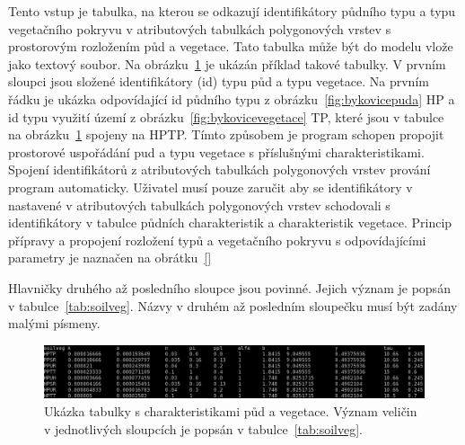 Tento vstup je tabulka, na kterou se odkazují identifikátory půdního typu a typu vegetačního pokryvu v atributových tabulkách polygonových vrstev s prostorovým rozložením půd a vegetace. Tato tabulka může být do modelu vlože jako textový soubor. Na obrázku~\ref{fig:tabsoilveg} je ukázán příklad takové tabulky. V prvním sloupci jsou složené identifikátory (id) typu půd a typu vegetace. Na prvním řádku je ukázka odpovídající id půdního typu z obrázku~\ref{fig:bykovicepuda} HP a id typu využití území z obrázku~\ref{fig:bykovicevegetace} TP, které jsou v tabulce na obrázku~\ref{fig:tabsoilveg} spojeny na HPTP. Tímto způsobem je program schopen propojit prostorové uspořádání pud a typu vegetace s příslušnými charakteristikami. Spojení identifikátorů z atributových tabulkách polygonových vrstev prování program automaticky. Uživatel musí pouze zaručit aby se identifikátory v nastavené v atributových tabulkách polygonových vrstev schodovali s identifikátory v tabulce půdních charakteristik a charakteristik vegetace. Princip přípravy a propojení rozložení typů a vegetačního pokryvu s odpovídajícími parametry je naznačen na obrátku~\ref{}

Hlavničky druhého až posledního sloupce jsou povinné. Jejich význam je popsán v tabulce~\ref{tab:soilveg}. Názvy v druhém až posledním sloupečku musí být zadány malými písmeny.
\begin{figure}
  \centering
  \includegraphics[width=1.0\textwidth]{./img/tabsoilveg.png}
  \caption{Ukázka tabulky s charakteristikami půd a vegetace. Význam veličin v jednotlivých sloupcích je popsán v tabulce~\ref{tab:soilveg}.}
  \label{fig:tabsoilveg}
\end{figure}




